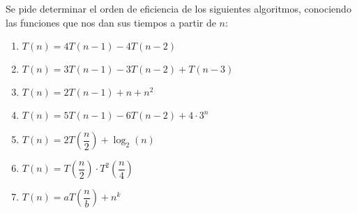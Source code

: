 \begin{ejercicio*}
    Se pide determinar el orden de eficiencia de los siguientes algoritmos, conociendo las funciones que nos dan sus tiempos a partir de $n$:
    \begin{enumerate}
    \item $T(n) = 4T(n-1)-4T(n-2)$
    \item $T(n) = 3T(n-1)-3T(n-2)+T(n-3)$
    \item $T(n) = 2T(n-1)+n+n^2$
    \item $T(n) = 5T(n-1)-6T(n-2)+4\cdot 3^n$
    \item $T(n) = 2T\left(\dfrac{n}{2}\right)+\log_2(n)$
    \item $T(n) = T\left(\dfrac{n}{2}\right)\cdot T^2\left(\dfrac{n}{4}\right)$
    \item $T(n) = aT\left(\dfrac{n}{b}\right)+n^k$
    \end{enumerate}
\end{ejercicio*}
